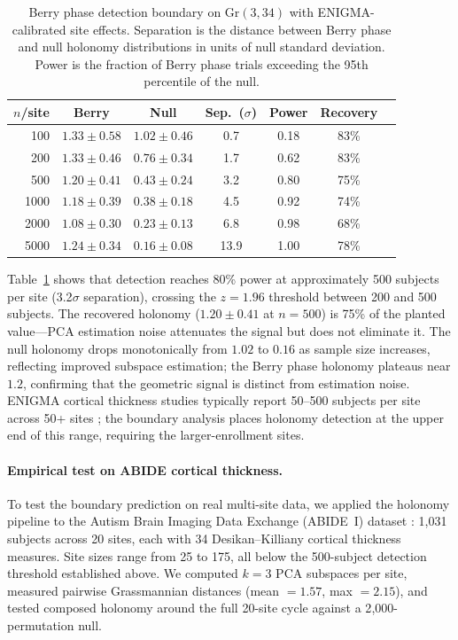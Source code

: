 \documentclass[11pt]{article}
\newcommand{\Gr}{\mathrm{Gr}}
\begin{document}
\begin{table}[t]
\centering
\caption{Berry phase detection boundary on $\Gr(3, 34)$ with ENIGMA-calibrated site effects. Separation is the distance between Berry phase and null holonomy distributions in units of null standard deviation. Power is the fraction of Berry phase trials exceeding the 95th percentile of the null.}
\label{tab:boundary}
\small
\begin{tabular}{@{}rcccccc@{}}
\toprule
\textbf{$n$/site} & \textbf{Berry} & \textbf{Null} & \textbf{Sep.\ ($\sigma$)} & \textbf{Power} & \textbf{Recovery} \\
\midrule
100  & $1.33 \pm 0.58$ & $1.02 \pm 0.46$ & 0.7 & 0.18 & 83\% \\
200  & $1.33 \pm 0.46$ & $0.76 \pm 0.34$ & 1.7 & 0.62 & 83\% \\
500  & $1.20 \pm 0.41$ & $0.43 \pm 0.24$ & 3.2 & 0.80 & 75\% \\
1000 & $1.18 \pm 0.39$ & $0.38 \pm 0.18$ & 4.5 & 0.92 & 74\% \\
2000 & $1.08 \pm 0.30$ & $0.23 \pm 0.13$ & 6.8 & 0.98 & 68\% \\
5000 & $1.24 \pm 0.34$ & $0.16 \pm 0.08$ & 13.9 & 1.00 & 78\% \\
\bottomrule
\end{tabular}
\end{table}

Table~\ref{tab:boundary} shows that detection reaches 80\% power at approximately 500 subjects per site (3.2$\sigma$ separation), crossing the $z = 1.96$ threshold between 200 and 500 subjects.
The recovered holonomy ($1.20 \pm 0.41$ at $n = 500$) is 75\% of the planted value---PCA estimation noise attenuates the signal but does not eliminate it.
The null holonomy drops monotonically from $1.02$ to $0.16$ as sample size increases, reflecting improved subspace estimation; the Berry phase holonomy plateaus near $1.2$, confirming that the geometric signal is distinct from estimation noise.
ENIGMA cortical thickness studies typically report 50--500 subjects per site across 50+ sites \citep{thompson2020enigma}; the boundary analysis places holonomy detection at the upper end of this range, requiring the larger-enrollment sites.

\paragraph{Empirical test on ABIDE cortical thickness.}
To test the boundary prediction on real multi-site data, we applied the holonomy pipeline to the Autism Brain Imaging Data Exchange (ABIDE~I) dataset \citep{di2014autism}: 1{,}031 subjects across 20 sites, each with 34 Desikan--Killiany cortical thickness measures.
Site sizes range from 25 to 175, all below the 500-subject detection threshold established above.
We computed $k = 3$ PCA subspaces per site, measured pairwise Grassmannian distances (mean $= 1.57$, max $= 2.15$), and tested composed holonomy around the full 20-site cycle against a 2{,}000-permutation null.
\end{document}
